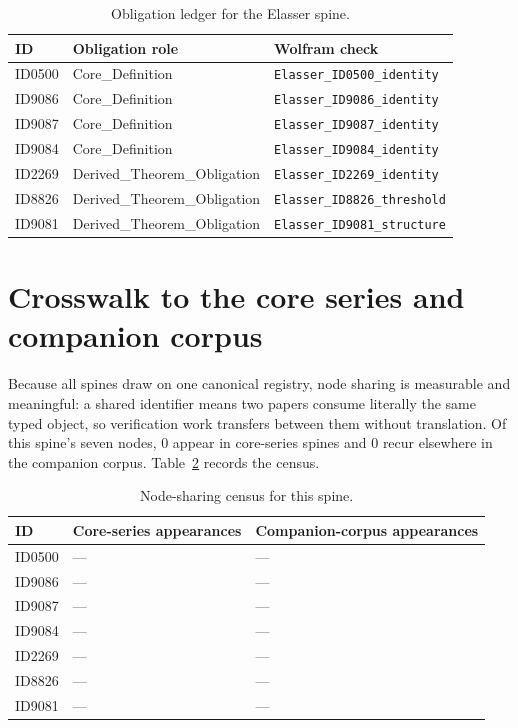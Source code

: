\documentclass[11pt]{article}
\theoremstyle{remark}
\begin{document}
\begin{table}[ht]
\centering
\small
\caption{Obligation ledger for the Elasser spine.}
\label{tab:obligations}
\begin{tabular}{llp{6.2cm}}
\toprule
ID & Obligation role & Wolfram check \\
\midrule
ID0500 & Core\_Definition & \texttt{Elasser\_ID0500\_identity} \\
ID9086 & Core\_Definition & \texttt{Elasser\_ID9086\_identity} \\
ID9087 & Core\_Definition & \texttt{Elasser\_ID9087\_identity} \\
ID9084 & Core\_Definition & \texttt{Elasser\_ID9084\_identity} \\
ID2269 & Derived\_Theorem\_Obligation & \texttt{Elasser\_ID2269\_identity} \\
ID8826 & Derived\_Theorem\_Obligation & \texttt{Elasser\_ID8826\_threshold} \\
ID9081 & Derived\_Theorem\_Obligation & \texttt{Elasser\_ID9081\_structure} \\
\bottomrule
\end{tabular}
\end{table}

\section{Crosswalk to the core series and companion corpus}
\label{sec:crosswalk}

Because all spines draw on one canonical registry, node sharing is measurable and meaningful: a shared identifier means two papers consume literally the same typed object, so verification work transfers between them without translation. Of this spine's seven nodes, 0 appear in core-series spines and 0 recur elsewhere in the companion corpus. Table~\ref{tab:crosswalk} records the census.

\begin{table}[ht]
\centering
\small
\caption{Node-sharing census for this spine.}
\label{tab:crosswalk}
\begin{tabular}{lp{4.4cm}p{6.6cm}}
\toprule
ID & Core-series appearances & Companion-corpus appearances \\
\midrule
ID0500 & --- & --- \\
ID9086 & --- & --- \\
ID9087 & --- & --- \\
ID9084 & --- & --- \\
ID2269 & --- & --- \\
ID8826 & --- & --- \\
ID9081 & --- & --- \\
\bottomrule
\end{tabular}
\end{table}
\end{document}
